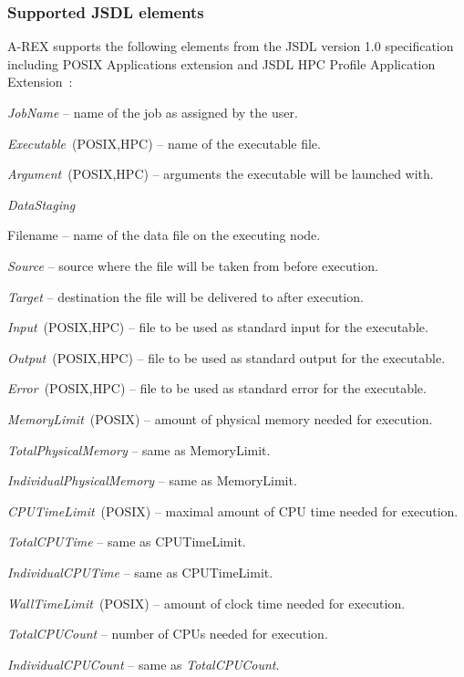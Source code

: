 \documentclass{article}                            %
\begin{document}
\subsubsection{Supported JSDL elements}

A-REX supports the following elements from the JSDL version 1.0 specification~\cite{jsdl}
including POSIX Applications extension and JSDL HPC Profile Application
Extension~\cite{jsdl-hpc}:

\begin{list}{--}{\setlength{\labelwidth}{0.5cm}\setlength{\rightmargin}{\leftmargin}}
\item [{\emph{JobName}}] -- name of the job as assigned by the user.
\item [{\emph{Executable}\ (POSIX,HPC)}] -- name of the executable file.
\item [{\emph{Argument}\ (POSIX,HPC)}] -- arguments the executable will
be launched with.
\item [{\emph{DataStaging}}]~
\begin{list}{--}{\setlength{\labelwidth}{0.5cm}\setlength{\rightmargin}{\leftmargin}}
\item [{Filename}] -- name of the data file on the executing node.
\item [{\emph{Source}}] -- source where the file will be taken from before
execution.
\item [{\emph{Target}}] -- destination the file will be delivered
to after execution.
\end{list}
\item [{\emph{Input}\ (POSIX,HPC)}] -- file to be used as standard input
for the executable.
\item [{\emph{Output}\ (POSIX,HPC)}] -- file to be used as standard output
for the executable.
\item [{\emph{Error}\ (POSIX,HPC)}] -- file to be used as standard error
for the executable.
\item [{\emph{MemoryLimit}\ (POSIX)}] -- amount of physical memory needed
for execution.
\item [{\emph{TotalPhysicalMemory}}] -- same as MemoryLimit.
\item [{\emph{IndividualPhysicalMemory}}] -- same as MemoryLimit.
\item [{\emph{CPUTimeLimit}\ (POSIX)}] -- maximal amount of CPU time needed
for execution.
\item [{\emph{TotalCPUTime}}] -- same as CPUTimeLimit.
\item [{\emph{IndividualCPUTime}}] -- same as CPUTimeLimit.
\item [{\emph{WallTimeLimit}\ (POSIX)}] -- amount of clock time needed
for execution.
\item [{\emph{TotalCPUCount}}] -- number of CPUs needed for execution.
\item [{\emph{IndividualCPUCount}}] -- same as \emph{TotalCPUCount}.
\end{list}
\end{document}
